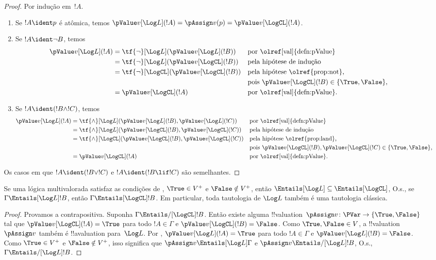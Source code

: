 \documentclass[../../../include/open-logic-section]{subfiles}
\begin{document}
\begin{proof}
  Por indução em~$!A$.
  \begin{enumerate}
  \item Se $!A \ident p$ é atômica, temos $\pValue v[\Log L](!A) =
  \pAssign v(p) = \pValue
  v[\LogCL](!A)$.
  \item Se $!A \ident \lnot B$, temos
  \begin{align*}
    \pValue v[\Log L](!A) & = \tf{\lnot}[\Log L](\pValue v[\Log L](!B)) & &\text{por \olref[val]{defn:pValue}}\\
    & = \tf{\lnot}[\Log L](\pValue v[\LogCL](!B)) && \text{pela hipótese de indução}\\
    & = \tf{\lnot}[\LogCL](\pValue v[\LogCL](!B)) 
&&\text{pela hipótese \olref{prop:not},}\\
&&&\text{pois $\pValue v[\LogCL](!B) \in \{\True, \False\}$,}\\
& = \pValue v[\LogCL](!A) &&\text{por \olref[val]{defn:pValue}}.
\end{align*}
\item Se $!A \ident (!B \land !C)$, temos
\begin{align*}
  \pValue v[\Log L](!A) & = \tf{\land}[\Log L](\pValue v[\Log L](!B), \pValue v[\Log L](!C)) & &\text{por \olref[val]{defn:pValue}}\\
  & = \tf{\land}[\Log L](\pValue v[\LogCL](!B),\pValue v[\LogCL](!C)) && \text{pela hipótese de indução}\\
  & = \tf{\land}[\LogCL](\pValue v[\LogCL](!B),\pValue v[\LogCL](!C)) 
&&\text{pela hipótese \olref{prop:land},}\\
&&&\text{pois $\pValue v[\LogCL](!B),\pValue v[\LogCL](!C) \in \{\True, \False\}$,}\\
& = \pValue v[\LogCL](!A) &&\text{por \olref[val]{defn:pValue}}.
\end{align*}
\end{enumerate}
Os casos em que $!A \ident (!B \lor !C)$ e $!A \ident (!B \lif !C)$
são semelhantes.
\end{proof}

\begin{cor}
  Se uma lógica multivalorada satisfaz as condições de
  , $\True \in V^+$ e $\False \notin V^+$, então
  ${\Entails[\Log L]} \subseteq {\Entails[\LogCL]}$, O.s.\@, se $\Gamma
  \Entails[\Log L] !B$, então $\Gamma \Entails[\LogCL] !B$. Em
  particular, toda tautologia de $\Log L$ também é uma tautologia clássica.
\end{cor}

\begin{proof}
  Provamos a contrapositiva. Suponha $\Gamma \Entails/[\LogCL] !B$.
  Então existe alguma !!{valuation}~$\pAssign v\colon \PVar \to
  \{\True, \False\}$ tal que $\pValue v[\LogCL](!A) = \True$ para todo
  $!A \in \Gamma$ e $\pValue v[\LogCL](!B) = \False$. Como $\True,
  \False \in V$, a !!{valuation}~$\pAssign v$ também é !!a{valuation}
  para~$\Log L$. Por , $\pValue v[\Log L](!A) =
  \True$ para todo $!A \in \Gamma$ e $\pValue v[\Log L](!B) = \False$.
  Como $\True \in V^+$ e $\False \notin V^+$, isso significa que $\pAssign v
  \Entails[\Log L] \Gamma$ e $\pAssign v \Entails/[\Log L] !B$,
  O.s.\@, $\Gamma \Entails/[\Log L] !B$.
\end{proof}
\end{document}
